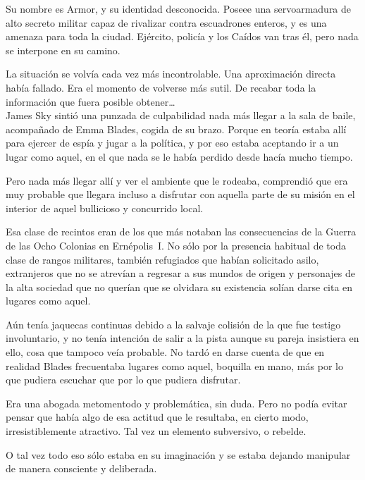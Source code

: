 \begin{prev}
    Su nombre es Armor, y su identidad desconocida. Poseee una servoarmadura de alto secreto militar capaz de rivalizar contra escuadrones enteros, y es una amenaza para toda la ciudad. Ejército, policía y los Caídos van tras él, pero nada se interpone en su camino.
\end{prev}

\noindent{}La situación se volvía cada vez más incontrolable. Una aproximación directa había fallado. Era el momento de volverse más sutil. De recabar toda la información que fuera posible obtener\dots\\

\noindent{}James Sky sintió una punzada de culpabilidad nada más llegar a la sala de baile, acompañado de Emma Blades, cogida de su brazo. Porque en teoría estaba allí para ejercer de espía y jugar a la política, y por eso estaba aceptando ir a un lugar como aquel, en el que nada se le había perdido desde hacía mucho tiempo.

Pero nada más llegar allí y ver el ambiente que le rodeaba, comprendió que era muy probable que llegara incluso a disfrutar con aquella parte de su misión en el interior de aquel bullicioso y concurrido local.

Esa clase de recintos eran de los que más notaban las consecuencias de la Guerra de las Ocho Colonias en Ernépolis~I. No sólo por la presencia habitual de toda clase de rangos militares, también refugiados que habían solicitado asilo, extranjeros que no se atrevían a regresar a sus mundos de origen y personajes de la alta sociedad que no querían que se olvidara su existencia solían darse cita en lugares como aquel.

Aún tenía jaquecas continuas debido a la salvaje colisión de la que fue testigo involuntario, y no tenía intención de salir a la pista aunque su pareja insistiera en ello, cosa que tampoco veía probable. No tardó en darse cuenta de que en realidad Blades frecuentaba lugares como aquel, boquilla en mano, más por lo que pudiera escuchar que por lo que pudiera disfrutar.

Era una abogada metomentodo y problemática, sin duda. Pero no podía evitar pensar que había algo de esa actitud que le resultaba, en cierto modo, irresistiblemente atractivo. Tal vez un elemento subversivo, o rebelde.

O tal vez todo eso sólo estaba en su imaginación y se estaba dejando manipular de manera consciente y deliberada.

